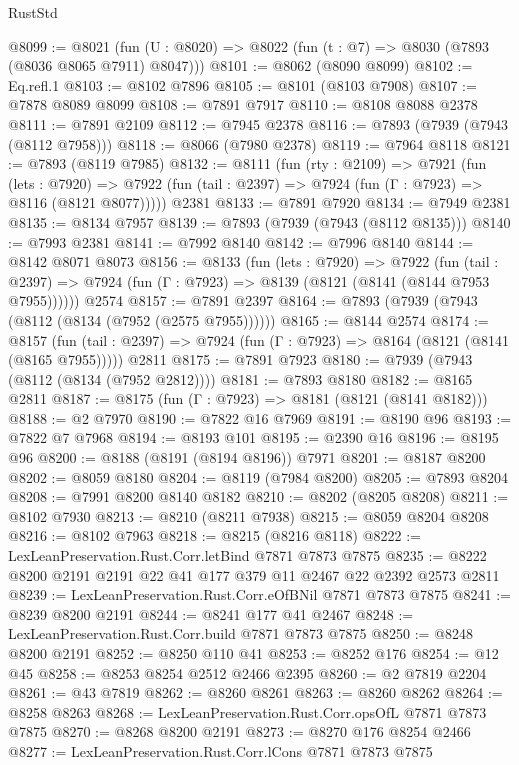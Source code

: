 \begin{lexlean}{RustStd}
\begin{coremodule}
@8099 := @8021 (fun (U : @8020) => @8022 (fun (t : @7) => @8030 (@7893 (@8036 @8065 @7911) @8047)))
@8101 := @8062 (@8090 @8099)
@8102 := Eq.refl.{1}
@8103 := @8102 @7896
@8105 := @8101 (@8103 @7908)
@8107 := @7878 @8089 @8099
@8108 := @7891 @7917
@8110 := @8108 @8088 @2378
@8111 := @7891 @2109
@8112 := @7945 @2378
@8116 := @7893 (@7939 (@7943 (@8112 @7958)))
@8118 := @8066 (@7980 @2378)
@8119 := @7964 @8118
@8121 := @7893 (@8119 @7985)
@8132 := @8111
    (fun (rty : @2109) =>
    @7921
      (fun (lets : @7920) =>
      @7922 (fun (tail : @2397) => @7924 (fun (Γ : @7923) => @8116 (@8121 @8077)))))
    @2381
@8133 := @7891 @7920
@8134 := @7949 @2381
@8135 := @8134 @7957
@8139 := @7893 (@7939 (@7943 (@8112 @8135)))
@8140 := @7993 @2381
@8141 := @7992 @8140
@8142 := @7996 @8140
@8144 := @8142 @8071 @8073
@8156 := @8133
    (fun (lets : @7920) =>
    @7922
      (fun (tail : @2397) => @7924 (fun (Γ : @7923) => @8139 (@8121 (@8141 (@8144 @7953 @7955))))))
    @2574
@8157 := @7891 @2397
@8164 := @7893 (@7939 (@7943 (@8112 (@8134 (@7952 (@2575 @7955))))))
@8165 := @8144 @2574
@8174 := @8157
    (fun (tail : @2397) => @7924 (fun (Γ : @7923) => @8164 (@8121 (@8141 (@8165 @7955)))))
    @2811
@8175 := @7891 @7923
@8180 := @7939 (@7943 (@8112 (@8134 (@7952 @2812))))
@8181 := @7893 @8180
@8182 := @8165 @2811
@8187 := @8175 (fun (Γ : @7923) => @8181 (@8121 (@8141 @8182)))
@8188 := @2 @7970
@8190 := @7822 @16 @7969
@8191 := @8190 @96
@8193 := @7822 @7 @7968
@8194 := @8193 @101
@8195 := @2390 @16
@8196 := @8195 @96
@8200 := @8188 (@8191 (@8194 @8196)) @7971
@8201 := @8187 @8200
@8202 := @8059 @8180
@8204 := @8119 (@7984 @8200)
@8205 := @7893 @8204
@8208 := @7991 @8200 @8140 @8182
@8210 := @8202 (@8205 @8208)
@8211 := @8102 @7930
@8213 := @8210 (@8211 @7938)
@8215 := @8059 @8204 @8208
@8216 := @8102 @7963
@8218 := @8215 (@8216 @8118)
@8222 := LexLeanPreservation.Rust.Corr.letBind @7871 @7873 @7875
@8235 := @8222 @8200 @2191 @2191 @22 @41 @177 @379 @11 @2467 @22 @2392 @2573 @2811
@8239 := LexLeanPreservation.Rust.Corr.eOfBNil @7871 @7873 @7875
@8241 := @8239 @8200 @2191
@8244 := @8241 @177 @41 @2467
@8248 := LexLeanPreservation.Rust.Corr.build @7871 @7873 @7875
@8250 := @8248 @8200 @2191
@8252 := @8250 @110 @41
@8253 := @8252 @176
@8254 := @12 @45
@8258 := @8253 @8254 @2512 @2466 @2395
@8260 := @2 @7819 @2204
@8261 := @43 @7819
@8262 := @8260 @8261
@8263 := @8260 @8262
@8264 := @8258 @8263
@8268 := LexLeanPreservation.Rust.Corr.opsOfL @7871 @7873 @7875
@8270 := @8268 @8200 @2191
@8273 := @8270 @176 @8254 @2466
@8277 := LexLeanPreservation.Rust.Corr.lCons @7871 @7873 @7875

\end{coremodule}
\end{lexlean}
